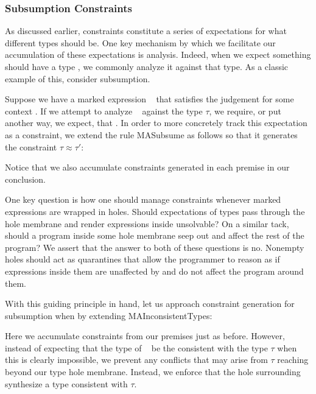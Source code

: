 \subsubsection{Subsumption Constraints}
As discussed earlier, constraints constitute a series of expectations for what different types should be. One key mechanism by which we facilitate our accumulation of these expectations is analysis. Indeed, when we expect something should have a type \TMV, we commonly analyze it against that type. As a classic example of this, consider subsumption. 

Suppose we have a marked expression \ECMV~ that satisfies the judgement  for some context \ctx. If we attempt to analyze \ECMV~ against the type $\tau$, we require, or put another way, we expect, that . In order to more concretely track this expectation as a constraint, we extend the rule MASubsume as follows so that it generates the constraint $\tau \approx \tau'$:
\begin{mathpar}
\end{mathpar}
Notice that we also accumulate constraints generated in each premise in our conclusion.

One key question is how one should manage constraints whenever marked expressions are wrapped in holes. Should expectations of types pass through the hole membrane and render expressions inside unsolvable? On a similar tack, should a program inside some hole membrane seep out and affect the rest of the program? We assert that the answer to both of these questions is no. Nonempty holes should act as quarantines that allow the programmer to reason as if expressions inside them are unaffected by and do not affect the program around them.

With this guiding principle in hand, let us approach constraint generation for subsumption when  by extending MAInconsistentTypes:
\begin{mathpar}
\end{mathpar}
Here we accumulate constraints from our premises just as before. However, instead of expecting that the type of \ECMV~ be the consistent with the type $\tau$ when this is clearly impossible, we prevent any conflicts that may arise from $\tau$ reaching beyond our type hole membrane. Instead, we enforce that the hole surrounding \ECMV~ synthesize a type consistent with $\tau$.

